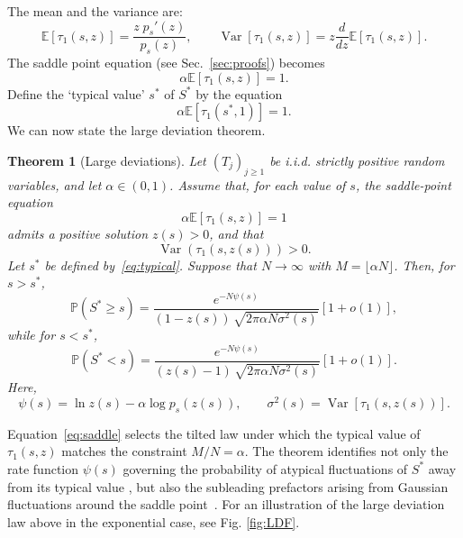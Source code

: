 \documentclass[a4paper,reqno,11pt]{amsart}
\numberwithin{equation}{section}
\def\EE{{\mathbb E}}
\def\PP{{\mathbb P}}
\newtheorem{thm}{Theorem}
\numberwithin{thm}{section}
\theoremstyle{plain}
\theoremstyle{definition}
\begin{document}
{The mean and the variance are:
\begin{equation}\label{eq:TiltedMeanVar}
\mathbb{E}[\tau_1(s,z)]
= \frac{z\;p_s'(z)}{p_s(z)},
\qquad
\operatorname{Var}[\tau_1(s,z)]
 = z\frac{d}{dz}\mathbb{E}[\tau_1(s,z)].  
\end{equation}
The saddle point equation (see Sec.~\ref{sec:proofs}) becomes
\begin{equation}\label{eq:saddle}
\alpha \mathbb{E}[\tau_1(s,z)]=1.
\end{equation}
Define the `typical value'  $s^*$ of $S^*$ by the equation 
\begin{equation}\label{eq:typical}
\alpha \mathbb{E}[\tau_1({s^*},1)]=1.
\end{equation}
We can now state the large deviation theorem.
\begin{thm}[Large deviations]
\label{thm:LD}
Let $(T_j)_{j\geq1}$ be i.i.d. strictly positive random variables, and 
let $\alpha\in (0,1)$. Assume that, for each value of $s$, 
the saddle-point equation
\begin{equation}
\label{eq:assump1}
    \alpha \EE[\tau_1(s,z)]=1
\end{equation}
admits a positive solution $z(s)>0$, and that
\begin{equation}
\label{eq:assump2}
    \operatorname{Var}(\tau_1(s,z(s)))>0.
\end{equation}
Let $s^*$ be defined by~\eqref{eq:typical}. Suppose that $N\to\infty$ with $M=\lfloor \alpha N\rfloor$. Then, for $s>s^*$,
\begin{equation}\label{eq:right-box}
 \PP(S^*\ge s) =
  \frac{e^{-N\psi(s)}}{(1{-}z(s))\,
  \sqrt{2\pi \alpha N\sigma^2(s)}}\left[1+o(1)\right],
\end{equation}
while for $s<s^*$,
\begin{equation}\label{eq:left-box}
\PP(S^*<s) =
  \frac{e^{-N\psi(s)}}{(z(s){-}1)\,
  \sqrt{2\pi \alpha N\sigma^2(s)}}\left[1+o(1)\right].
\end{equation}
Here, 
    \begin{equation}\label{eq:psi}
    \psi(s)=\ln z(s)-\alpha\log p_s(z(s)),\qquad\sigma^2(s) =\operatorname{Var}[\tau_1(s,z(s))]. 
    \end{equation}
\end{thm}
 Equation~\eqref{eq:saddle} selects the tilted law under which the typical value of $\tau_1(s,z)$ matches the constraint $M/N=\alpha$. The theorem identifies not only the  rate function $\psi(s)$ governing the probability of atypical fluctuations of $S^*$ away from its typical value \cite{Touchette2009}, but also the subleading prefactors arising from Gaussian fluctuations around the saddle point~\cite{Daniels1954}.  
For an illustration of the large deviation law above in the exponential case, see Fig. \ref{fig:LDF}.

}
\end{document}

